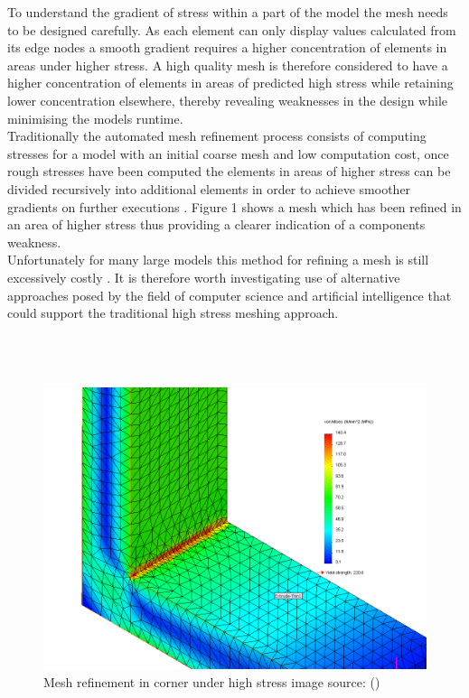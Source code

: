 \noindent
To understand the gradient of stress within a part of the model the mesh needs to be designed carefully. As each element can only display values calculated from its edge nodes a smooth gradient requires a higher concentration of elements in areas under higher stress. A high quality mesh is therefore considered to have a higher concentration of elements in areas of predicted high stress while retaining lower concentration elsewhere, thereby revealing weaknesses in the design while minimising the models runtime.\\

\noindent
Traditionally the automated mesh refinement process consists of computing stresses for a model with an initial coarse mesh and low computation cost, once rough stresses have been computed the elements in areas of higher stress can be divided recursively into additional elements in order to achieve smoother gradients on further executions \cite{cite03}. Figure 1 shows a mesh which has been refined in an area of higher stress thus providing a clearer indication of a components weakness. \\ 

\noindent
Unfortunately for many large models this method for refining a mesh is still excessively costly \cite{DolsakPaper91}. It is therefore worth investigating use of alternative approaches posed by the field of computer science and artificial intelligence that could support the traditional high stress meshing approach. \\ \\ \\ \\

\begin{figure}[H]
  \centerline{\includegraphics[width=150mm, scale=0.5]{../Graphics/StressedCorner.png}}
  \caption{Mesh refinement in corner under high stress image source: (\cite{HighStressCorner})}
  \label{fig:boat1}
\end{figure}